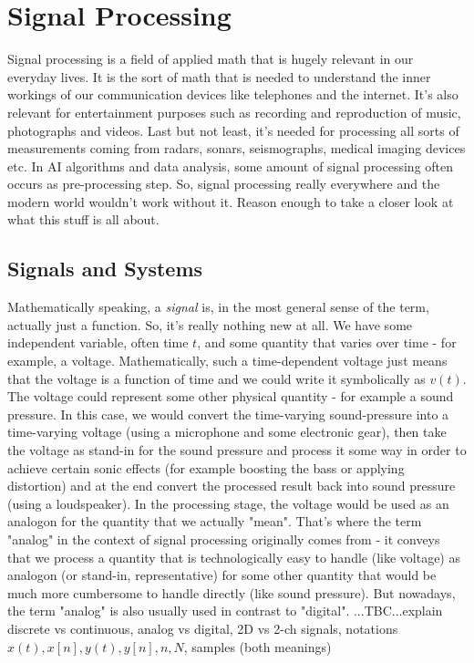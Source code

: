 \chapter{Signal Processing}
Signal processing is a field of applied math that is hugely relevant in our everyday lives. It is the sort of math that is needed to understand the inner workings of our communication devices like telephones and the internet. It's also relevant for entertainment purposes such as recording and reproduction of music, photographs and videos. Last but not least, it's needed for processing all sorts of measurements coming from radars, sonars, seismographs, medical imaging devices etc. In AI algorithms and data analysis, some amount of signal processing often occurs as pre-processing step. So, signal processing really everywhere and the modern world wouldn't work without it. Reason enough to take a closer look at what this stuff is all about.


\section{Signals and Systems}
Mathematically speaking, a \emph{signal} is, in the most general sense of the term, actually just a function. So, it's really nothing new at all. We have some independent variable, often time $t$, and some quantity that varies over time - for example, a voltage. Mathematically, such a time-dependent voltage just means that the voltage is a function of time and we could write it symbolically as $v(t)$. The voltage could represent some other physical quantity - for example a sound pressure. In this case, we would convert the time-varying sound-pressure into a time-varying voltage (using a microphone and some electronic gear), then take the voltage as stand-in for the sound pressure and process it some way in order to achieve certain sonic effects (for example boosting the bass or applying distortion) and at the end convert the processed result back into sound pressure (using a loudspeaker). In the processing stage, the voltage would be used as an analogon for the quantity that we actually "mean". That's where the term "analog" in the context of signal processing originally comes from - it conveys that we process a quantity that is technologically easy to handle (like voltage) as analogon (or stand-in, representative) for some other quantity that would be much more cumbersome to handle directly (like sound pressure). But nowadays, the term "analog" is also usually used in contrast to "digital". ...TBC...explain discrete vs continuous, analog vs digital, 2D vs 2-ch signals, notations $x(t), x[n], y(t), y[n], n, N$, samples (both meanings)


